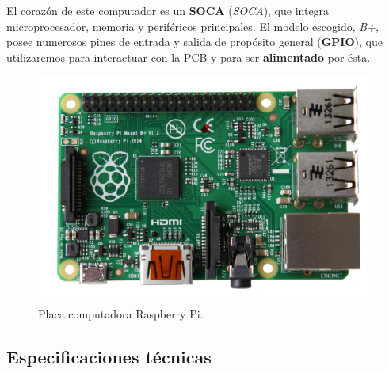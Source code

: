 El corazón de este computador es un \textbf{\acrshort{SOCA}} (\textit{\acrlong{SOCA}}), que integra microprocesador, memoria y periféricos principales. El modelo escogido, \textit{B+}, posee numerosos pines de entrada y salida de propósito general (\textbf{\acrshort{GPIO}}), que utilizaremos para interactuar con la \acrshort{PCB} y para ser \textbf{alimentado} por ésta.

\smallskip

\begin{figure}[H]
	\noindent \begin{centering}
		\includegraphics[width=\linewidth/2]{capitulo3/raspberry}
		\par\end{centering}
	\smallskip
	\caption{\label{fig:raspberry} Placa computadora Raspberry Pi.}
\end{figure} 

\smallskip

\subsection{Especificaciones técnicas}

\smallskip


